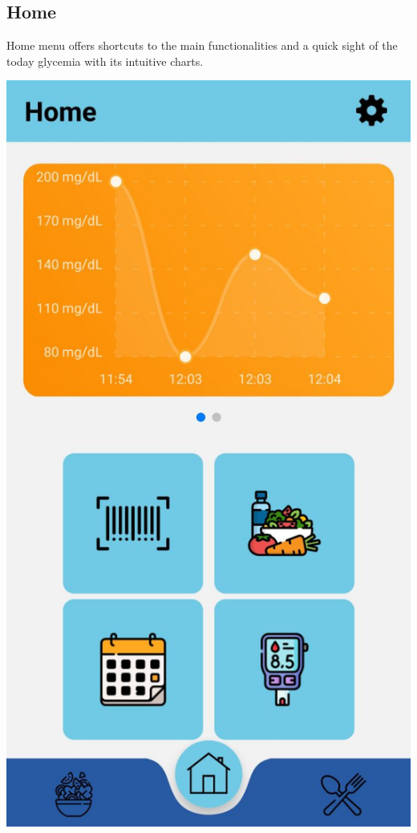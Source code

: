 \documentclass[12pt,hidelinks]{article}
\begin{document}
	\subsection{Home}
    Home menu offers shortcuts to the main functionalities and a quick sight of the today glycemia with its intuitive charts.
	\begin{center}

	\includegraphics[scale=0.2]{screenshot3}
\end{center}
\end{document}
